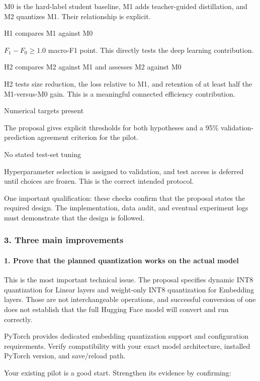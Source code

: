 M0 is the hard-label student baseline, M1 adds teacher-guided distillation, and M2 quantizes M1. Their relationship is explicit.

H1 compares M1 against M0

$F_1-F_0\geq1.0$ macro-F1 point. This directly tests the deep learning contribution.

H2 compares M2 against M1 and assesses M2 against M0

H2 tests size reduction, the loss relative to M1, and retention of at least half the M1-versus-M0 gain. This is a meaningful connected efficiency contribution.

Numerical targets present

The proposal gives explicit thresholds for both hypotheses and a 95\% validation-prediction agreement criterion for the pilot.

No stated test-set tuning

Hyperparameter selection is assigned to validation, and test access is deferred until choices are frozen. This is the correct intended protocol.

One important qualification: these checks confirm that the proposal states the required design. The implementation, data audit, and eventual experiment logs must demonstrate that the design is followed.

\subsubsection*{3. Three main improvements}
\paragraph*{1. Prove that the planned quantization works on the actual model}
This is the most important technical issue. The proposal specifies dynamic INT8 quantization for Linear layers and weight-only INT8 quantization for Embedding layers. Those are not interchangeable operations, and successful conversion of one does not establish that the full Hugging Face model will convert and run correctly.

PyTorch provides dedicated embedding quantization support and configuration requirements. Verify compatibility with your exact model architecture, installed PyTorch version, and save/reload path.

Your existing pilot is a good start. Strengthen its evidence by confirming:

